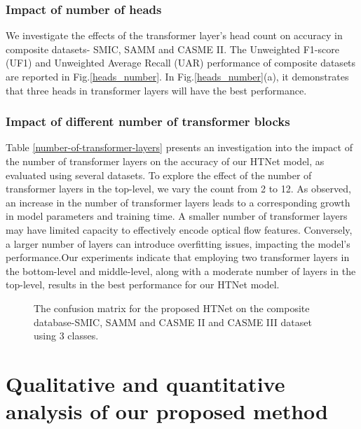 \documentclass[review,12pt, 3p]{elsarticle}
\begin{document}
\subsubsection{Impact of number of heads}
 We investigate the effects of the transformer layer's head count on accuracy in composite datasets- SMIC, SAMM and CASME II. The Unweighted F1-score (UF1) and Unweighted Average Recall (UAR) performance of composite datasets are reported in Fig.\ref{heads_number}. In Fig.\ref{heads_number}(a), it demonstrates that three heads in transformer layers will have the best performance. 

\subsubsection{Impact of different number of transformer blocks}
Table \ref{number-of-transformer-layers} presents an investigation into the impact of the number of transformer layers on the accuracy of our HTNet model, as evaluated using several datasets. To explore the effect of the number of transformer layers in the top-level, we vary the count from 2 to 12. As observed, an increase in the number of transformer layers leads to a corresponding growth in model parameters and training time. A smaller number of transformer layers may have limited capacity to effectively encode optical flow features. Conversely, a larger number of layers can introduce overfitting issues, impacting the model's performance.Our experiments indicate that employing two transformer layers in the bottom-level and middle-level, along with a moderate number of layers in the top-level, results in the best performance for our HTNet model.

\begin{figure*}[!t]
\centering
{}
\hfill
{}
\caption{The confusion matrix for the proposed HTNet on the
composite database-SMIC, SAMM and CASME II and CASME III dataset using 3 classes.}
\label{fig_combine_confusion_matrix}
\end{figure*}
\section {Qualitative and quantitative analysis of our proposed method}
\end{document}
